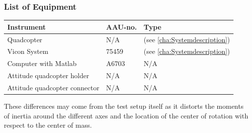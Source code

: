 \subsubsection{List of Equipment}
\begin{table}[H]
    \centering
	\begin{tabular}{|l|l|p{4.3cm}|}
		\hline%
		\textbf{Instrument}   &  \textbf{AAU-no.}  &  \textbf{Type}                       \\
		\hline%
		Quadcopter    	&  N/A 						&  (see \autoref{cha:Systemdescription}) 		      	 \\
		\hline%
	    Vicon System 			& 75459                 &  (see \autoref{cha:Systemdescription})                  \\
		\hline%
		Computer with Matlab       &  A6703		 & N/A     \\
		\hline%
		Attitude quadcopter holder      &  N/A		 & N/A     \\
		\hline%
		Attitude quadcopter connector    &  N/A		 & N/A     \\
		\hline%
	\end{tabular}
\end{table}


These differences may come from the test setup itself as it distorts the moments of inertia around the different axes and the location of the center of rotation with respect to the center of mass. %
